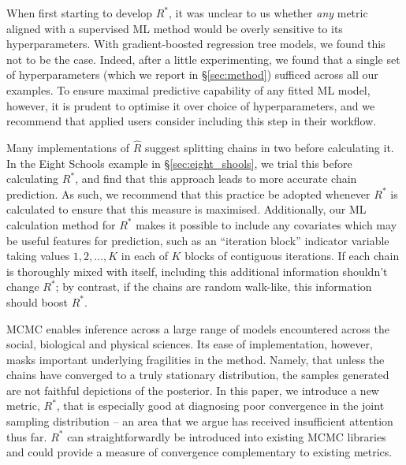 \documentclass{article}
\begin{document}
When first starting to develop $R^*$, it was unclear to us whether \textit{any} metric aligned with a supervised ML method would be overly sensitive to its hyperparameters. With gradient-boosted regression tree models, we found this not to be the case. Indeed, after a little experimenting, we found that a single set of hyperparameters (which we report in \S\ref{sec:method}) sufficed across all our examples. To ensure maximal predictive capability of any fitted ML model, however, it is prudent to optimise it over choice of hyperparameters, and we recommend that applied users consider including this step in their workflow.

Many implementations of $\hat{R}$ suggest splitting chains in two before calculating it. In the Eight Schools example in \S\ref{sec:eight_shools}, we trial this before calculating $R^*$, and find that this approach leads to more accurate chain prediction. As such, we recommend that this practice be adopted whenever $R^*$ is calculated to ensure that this measure is maximised. Additionally, our ML calculation method for $R^*$ makes it possible to include any covariates which may be useful features for prediction, such as an ``iteration block'' indicator variable taking values $1, 2, ..., K$ in each of $K$ blocks of contiguous iterations. If each chain is thoroughly mixed with itself, including this additional information shouldn't change $R^*$; by contrast, if the chains are random walk-like, this information should boost $R^*$.

MCMC enables inference across a large range of models encountered across the social, biological and physical sciences. Its ease of implementation, however, masks important underlying fragilities in the method. Namely, that unless the chains have converged to a truly stationary distribution, the samples generated are not faithful depictions of the posterior. In this paper, we introduce a new metric, $R^*$, that is especially good at diagnosing poor convergence in the joint sampling distribution -- an area that we argue has received insufficient attention thus far. $R^*$ can straightforwardly be introduced into existing MCMC libraries and could provide a measure of convergence complementary to existing metrics.

	

 
	
\end{document}
